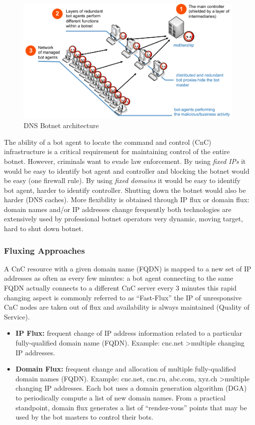 \documentclass[11pt,oneside,a4paper]{article}
\begin{document}
\begin{figure}[hb]
	\centering
	\includegraphics[width=0.7\linewidth]{figures/dns_botnet_architecture}
	\caption{DNS Botnet architecture}
	\label{fig:dnsbotnetarchitecture}
\end{figure}

The ability of a bot agent to locate the command and control (CnC) infrastructure
is a critical requirement for maintaining control of the entire botnet. However, criminals want to evade law enforcement. By using \textit{fixed IPs} it would be easy to identify bot agent and controller and blocking the botnet would be easy (one firewall rule). By using \textit{fixed domains} it would be easy to identify bot agent, harder to identify controller. Shutting down the botnet would also be harder (DNS caches). More flexibility is obtained through IP flux or domain flux: domain names and/or IP addresses change frequently both technologies are extensively used by professional botnet operators very dynamic, moving target, hard to shut down botnet.

\subsubsection{Fluxing Approaches}

A CnC resource with a given domain name (FQDN) is mapped to a new set of IP addresses as often as every few minutes: a bot agent connecting to the same FQDN actually connects to a different CnC server every 3 minutes this rapid changing aspect is commonly referred to as “Fast-Flux” the IP of unresponsive CnC nodes are taken out of flux and availability is always maintained (Quality of Service).

\vspace{-\topsep}
\begin{itemize}
	\setlength{\itemsep}{0pt}
	\setlength{\parskip}{0pt}
	\item \textbf{IP Flux:} frequent change of IP address information related to a particular fully-qualified domain name (FQDN). Example: cnc.net \textgreater multiple changing IP addresses.
	\item \textbf{Domain Flux:} frequent change and allocation of multiple fully-qualified domain names (FQDN). Example: cnc.net, cnc.ru, abc.com, xyz.ch \textgreater multiple changing IP addresses. Each bot uses a domain generation algorithm (DGA) to periodically compute a list
	of new domain names. From a practical standpoint, domain flux generates a list of “rendez-vous” points that may be used by the bot masters to control their bots.
\end{itemize}
\vspace{-\topsep}
\end{document}
